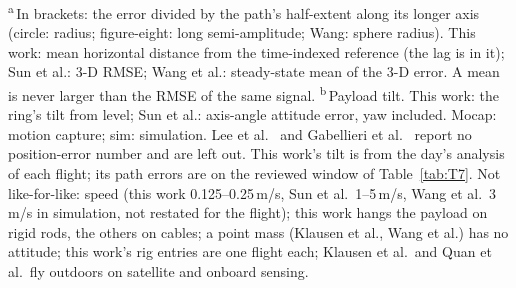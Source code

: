 \begin{table}[htbp]
\smallskip
\parbox{\textwidth}{\scriptsize\raggedright
\textsuperscript{a}\,In brackets: the error divided by the path's half-extent along its longer axis
(circle: radius; figure-eight: long semi-amplitude; Wang: sphere radius). This work: mean horizontal
distance from the time-indexed reference (the lag is in it); Sun et al.: 3-D RMSE; Wang et al.:
steady-state mean of the 3-D error. A mean is never larger than the RMSE of the same signal.
\textsuperscript{b}\,Payload tilt. This work: the ring's tilt from level; Sun et al.: axis-angle attitude
error, yaw included. Mocap: motion capture; sim: simulation.
Lee et al.\ \cite{lee2018geometric} and Gabellieri et al.\ \cite{gabellieri2023force} report no position-error number and are left out. This work's tilt is from the day's analysis of each flight; its path errors are on the reviewed window of
Table~\ref{tab:T7}. Not like-for-like: speed (this work 0.125--0.25\,m/s, Sun et al.\ 1--5\,m/s, Wang et al.\ 3\,m/s in
simulation, not restated for the flight); this work hangs the payload on rigid rods, the others on
cables; a point mass (Klausen et al., Wang et al.) has no attitude;
this work's rig entries are one flight each;  Klausen et al.\ and Quan et al.\ fly outdoors on satellite and onboard sensing.}
\end{table}
%
%
